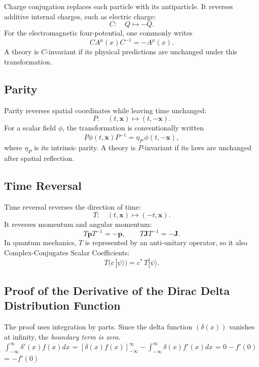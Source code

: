 \documentclass[a4paper, 10pt, onepage]{elegantbook}
\begin{document}
Charge conjugation replaces each particle with its antiparticle. It
reverses additive internal charges, such as electric charge:
\[
C:\quad Q\longmapsto -Q.
\]
For the electromagnetic four-potential, one commonly writes
\[
C A^\mu(x) C^{-1}=-A^\mu(x).
\]
A theory is \(C\)-invariant if its physical predictions are unchanged
under this transformation.

\subsection{Parity}

Parity reverses spatial coordinates while leaving time unchanged:
\[
P:\quad (t,\mathbf{x})\longmapsto(t,-\mathbf{x}).
\]
For a scalar field \(\phi\), the transformation is conventionally
written
\[
P\phi(t,\mathbf{x})P^{-1}
=\eta_P\,\phi(t,-\mathbf{x}),
\]
where \(\eta_P\) is its intrinsic parity. A theory is \(P\)-invariant
if its laws are unchanged after spatial reflection.

\subsection{Time Reversal}

Time reversal reverses the direction of time:
\[
T:\quad (t,\mathbf{x})\longmapsto(-t,\mathbf{x}).
\]
It reverses momentum and angular momentum:
\[
T\mathbf{p}T^{-1}=-\mathbf{p},
\qquad
T\mathbf{J}T^{-1}=-\mathbf{J}.
\]
In quantum mechanics, \(T\) is represented by an anti-unitary operator, so it also Complex-Conjugates Scalar Coefficients:
\[
T\bigl(c\,|\psi\rangle\bigr)
=c^*\,T|\psi\rangle.
\]











\subsection{Proof of the Derivative of the Dirac Delta Distribution Function}

The proof uses integration by parts. Since the delta function $(\delta(x))$ vanishes at infinity, the \emph{boundary term is zero}.  \\

$\int_{-\infty}^{\infty} \delta'(x) f(x) dx$ = $\left[ \delta(x) f(x) \right]_{-\infty}^{\infty} - \int_{-\infty}^{\infty} \delta(x) f'(x) dx$ = $0 - f'(0)$ = $-f'(0)$  \\
\end{document}
